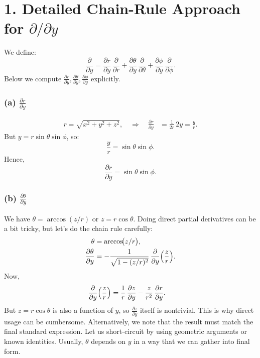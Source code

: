 \documentclass[12pt]{article}
\begin{document}
\section*{1. Detailed Chain-Rule Approach for $\partial/\partial y$}
We define:
\[
\frac{\partial}{\partial y} = \frac{\partial r}{\partial y}\,\frac{\partial}{\partial r}
+ \frac{\partial \theta}{\partial y}\,\frac{\partial}{\partial \theta}
+ \frac{\partial \phi}{\partial y}\,\frac{\partial}{\partial \phi}.
\]
Below we compute $\frac{\partial r}{\partial y}, \frac{\partial \theta}{\partial y}, \frac{\partial \phi}{\partial y}$ explicitly.

\subsubsection*{(a) $\frac{\partial r}{\partial y}$}
\begin{align*}
 r = \sqrt{x^2 + y^2 + z^2},\quad \Rightarrow\quad
 \frac{\partial r}{\partial y} &= \frac{1}{2r}\, 2y = \frac{y}{r}.
\end{align*}
But $y = r\sin\theta\sin\phi$, so:
\[
\frac{y}{r} = \sin\theta\sin\phi.
\]
Hence,
\[
\frac{\partial r}{\partial y} = \sin\theta\sin\phi.
\]

\subsubsection*{(b) $\frac{\partial \theta}{\partial y}$}
We have $\theta = \arccos(z/r)$ or $z=r\cos\theta$. Doing direct partial derivatives can be a bit tricky, but let's do the chain rule carefully:
\begin{align*}
 \theta &= \arccos\!\bigl(z / r\bigr),\\
 \frac{\partial \theta}{\partial y}
 &= -\frac{1}{\sqrt{1 - (z/r)^2}}\, \frac{\partial}{\partial y}\Bigl(\frac{z}{r}\Bigr).
\end{align*}
Now,
\begin{align*}
 \frac{\partial}{\partial y}\Bigl(\frac{z}{r}\Bigr)
 &= \frac{1}{r}\,\frac{\partial z}{\partial y} - \frac{z}{r^2}\,\frac{\partial r}{\partial y}.
\end{align*}
But $z = r\cos\theta$ is also a function of $y$, so $\frac{\partial z}{\partial y}$ itself is nontrivial. This is why direct usage can be cumbersome.\newline
Alternatively, we note that the result must match the final standard expression. Let us short-circuit by using geometric arguments or known identities. Usually, $\theta$ depends on $y$ in a way that we can gather into final form.
\end{document}
